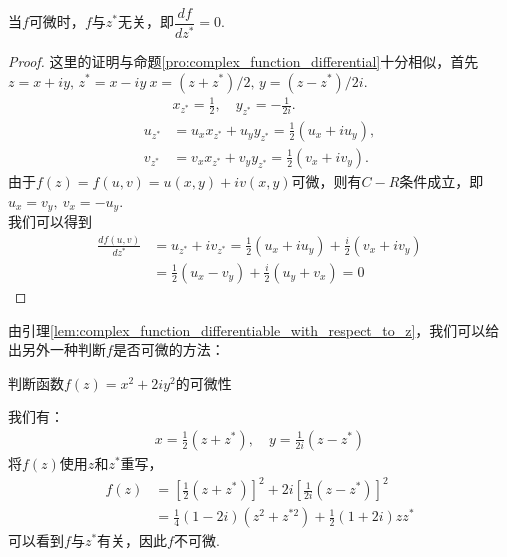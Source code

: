         \begin{lemma}
            \label{lem:complex_function_differentiable_with_respect_to_z}
            当$f$可微时，$f$与$z^*$无关，即$\dfrac{df}{dz^*} = 0$.
        \end{lemma}
        \begin{proof}
            这里的证明与命题\ref{pro:complex_function_differential}十分相似，首先$z=x+iy,\,z^*=x-iy\ x=(z+z^*)/2,\,y=(z-z^*)/2i$.
            \begin{align*}
                &x_{z^*}=\frac{1}{2},\quad y_{z^*}=-\frac{1}{2i}.\\
                u_{z^*}&=u_x x_{z^*} + u_y y_{z^*}=\frac{1}{2}(u_x+iu_y),\\
                v_{z^*}&=v_x x_{z^*} + v_y y_{z^*}=\frac{1}{2}(v_x+iv_y).
            \end{align*}
            由于$f(z)=f(u,v)=u(x,y)+iv(x,y)$可微，则有$C-R$条件成立，即$u_x=v_y,\ v_x=-u_y$.\\
            我们可以得到
            \begin{align*}
                \frac{df(u,v)}{dz^*}&=u_{z^*}+iv_{z^*}=\frac{1}{2}(u_x+iu_y)+\frac{i}{2}(v_x+iv_y)\\
                &=\frac{1}{2}(u_x-v_y)+\frac{i}{2}(u_y+v_x)=0
            \end{align*}

        \end{proof}
        由引理\ref{lem:complex_function_differentiable_with_respect_to_z}，我们可以给出另外一种判断$f$是否可微的方法：
        \begin{example}
            判断函数$f(z) = x^2 +2iy^2$的可微性
        \end{example}
        \begin{solution}
            我们有：
            \begin{align*}
                x = \frac{1}{2}(z + z^*), \quad y = \frac{1}{2i}(z - z^*)
            \end{align*}
            将$f(z)$使用$z$和$z^*$重写，
            \begin{align*}
                f(z) &= [\frac{1}{2}(z + z^*)]^2 + 2i[\frac{1}{2i}(z - z^*)]^2\\
                &= \frac{1}{4}(1 - 2i)(z^2 + z^{*2}) + \frac{1}{2}(1 + 2i)zz^*
            \end{align*}
            可以看到$f$与$z^*$有关，因此$f$不可微.
        \end{solution}

